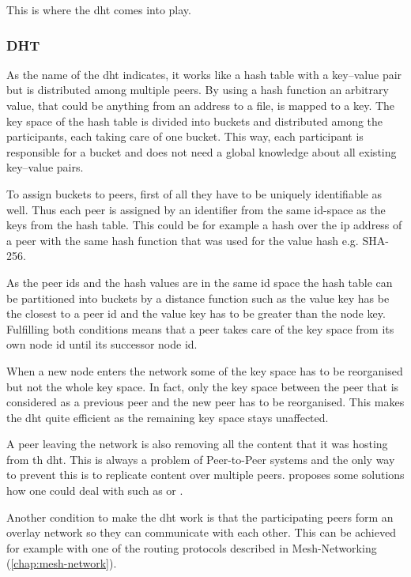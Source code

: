 This is where the \gls{dht} comes into play.

\subsubsection{DHT}
As the name of the \gls{dht} indicates, it works like a hash table with a key–value pair but is distributed among multiple peers. By using a hash function an arbitrary value, that could be anything from an address to a file, is mapped to a key. The key space of the hash table is divided into buckets and distributed among the participants, each taking care of one bucket. This way, each participant is responsible for a bucket and does not need a global knowledge about all existing key–value pairs.

To assign buckets to peers, first of all they have to be uniquely identifiable as well. Thus each peer is assigned by an identifier from the same id-space as the keys from the hash table. This could be for example a hash over the \gls{ip} address of a peer with the same hash function that was used for the value hash e.g. SHA-256.

As the peer ids and the hash values are in the same id space the hash table can be partitioned into buckets by a distance function such as the value key has be the closest to a peer id and the value key has to be greater than the node key. Fulfilling both conditions means that a peer takes care of the key space from its own node id until its successor node id.

When a new node enters the network some of the key space has to be reorganised but not the whole key space. In fact, only the key space between the peer that is considered as a previous peer and the new peer has to be reorganised. This makes the \gls{dht} quite efficient as the remaining key space stays unaffected. 

A peer leaving the network is also removing all the content that it was hosting from th \gls{dht}. This is always a problem of Peer-to-Peer systems and the only way to prevent this is to replicate content over multiple peers. \citet[\S3]{chord} proposes some solutions how one could deal with such as  or .

Another condition to make the \gls{dht} work is that the participating peers form an overlay network so they can communicate with each other. This can be achieved for example with one of the routing protocols described in Mesh-Networking (\vref{chap:mesh-network}).

